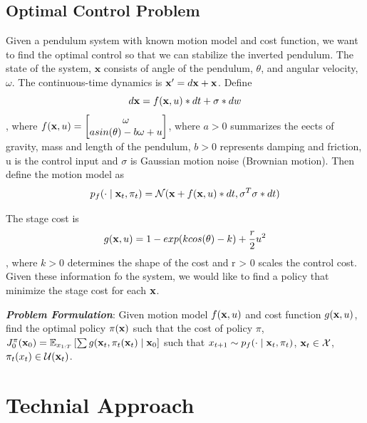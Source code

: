 \documentclass[letterpaper, 10 pt, conference]{ieeeconf}  %
\begin{document}
\subsection{Optimal Control Problem}
Given a pendulum system with known motion model and cost function, we want to find the optimal control so that we can stabilize the 
inverted pendulum. The state of the system, $\mathbf{x}$ consists of angle of the pendulum, $\theta$, and angular velocity, $\omega$. 
The continuous-time dynamics is $\mathbf{x}' = d\mathbf{x} + \mathbf{x}$. 
Define 
\begin{equation}
d\mathbf{x} = f(\mathbf{x}, u) * dt + \sigma * dw
\end{equation}, where $f(\mathbf{x}, u) = \begin{bmatrix}
\omega \\ 
asin(\theta) - b\omega + u
\end{bmatrix}$, where $a>0$ summarizes the eects of gravity, mass and length of the pendulum, $b > 0$ represents damping and friction, 
u is the control input and $\sigma$ is Gaussian motion noise (Brownian motion). Then define the motion model as
\begin{equation}
    p_f(\cdot \mid \mathbf{x}_t, \pi_t) =  \mathcal{N}(\mathbf{x}+f(\mathbf{x}, u)*dt, \sigma^T\sigma*dt)
\end{equation}

The stage cost is 
\begin{equation}
g(\mathbf{x}, u) = 1 - exp(kcos(\theta) - k) + \frac{r}{2}u^2
\end{equation}, where $k>0$ determines the shape of the cost and r > 0 scales the control cost. Given these information fo the 
system, we would like to find a policy that minimize the stage cost for each $\mathbf{x}$.

\textbf{\textit{Problem Formulation}}: 
Given motion model $f(\mathbf{x}, u)$ and cost function $g(\mathbf{x}, u)$, find the optimal policy $\pi(\mathbf{x})$ such that the cost of policy $\pi$,
$J^{\pi}_0(\mathbf{x}_0) = \mathbb{E}_{x_{1:T}}\left [  \sum g(\mathbf{x}_t, \pi_t(\mathbf{x}_t) \mid \mathbf{x}_0 \right]$ such that 
$x_{t+1} \sim p_f(\cdot \mid \mathbf{x}_t, \pi_t)$, $\mathbf{x}_t \in \mathcal{X}$, $\pi_t(x_t) \in \mathcal{U}(\mathbf{x}_t)$. 



\section{Technial Approach}
\end{document}
